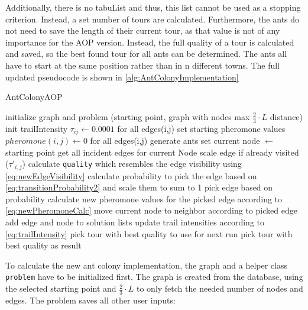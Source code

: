 Additionally, there is no tabuList and thus, this list cannot be used as a stopping criterion. 
Instead, a set number of tours are calculated.
Furthermore, the ants do not need to save the length of their current tour, as that value is not of any importance for the AOP version. 
Instead, the full quality of a tour is calculated and saved, so the best found tour for all ants can be determined.
The ants all have to start at the same position rather than in n different towns. 
The full updated pseudocode is shown in \ref{alg:AntColonyImplementation}


\begin{breakablealgorithm}
	\caption{AntColonyAOP}
	\label{alg:AntColonyImplementation}
	\begin{algorithmic}[1]
		\STATE initialize graph and problem (starting point, graph with nodes max $\frac{2}{3} \cdot L$ distance)
		\STATE init trailIntensity $\tau_{ij} \gets 0.0001$ for all edges(i,j)
		\STATE set starting pheromone values $pheromone(i,j) \gets 0$ for all edges(i,j)
		\STATE generate ants
		\STATE set current node $\gets$ starting point
		\STATE get all incident edges for current Node
		\STATE scale edge if already visited ($\tau'_{i,j}$)
		\STATE calculate \texttt{quality} which resembles the edge visibility using \ref{eq:newEdgeVisibility}
		\ENDFOR
		\STATE calculate probability to pick the edge based on \ref{eq:transitionProbability2} and scale them to sum to 1
		\STATE pick edge based on probability
		\STATE calculate new pheromone values for the picked edge according to \ref{eq:newPheromoneCalc}
		\STATE move current node to neighbor according to picked edge 
		\STATE add edge and node to solution lists
		\ENDWHILE
		\ENDFOR
		\STATE update trail intensities according to \ref{eq:trailIntensity}
		\STATE pick tour with best quality to use for next run
		\ENDFOR
		\STATE pick tour with best quality as result
	\end{algorithmic}	
\end{breakablealgorithm}

To calculate the new ant colony implementation, the graph and a helper class \texttt{problem} have to be initialized first. 
The graph is created from the database, using the selected starting point and $\frac{2}{3} \cdot L$ to only fetch the needed number of nodes and edges.
The problem saves all other user inputs:


